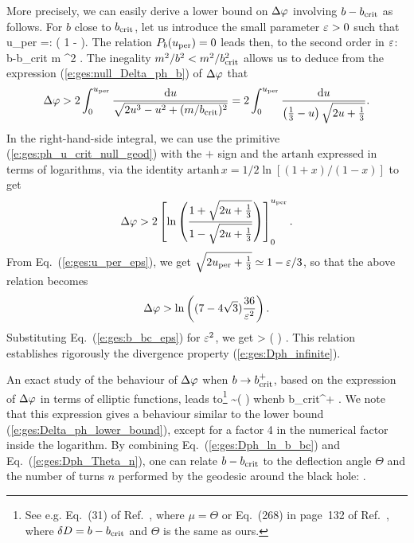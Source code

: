 More precisely, we can easily derive a lower bound on $\Delta\varphi$ involving
$b-b_{\rm crit}$ as follows. For $b$ close to $b_{\rm crit}$, let us introduce
the small parameter $\varepsilon >0$ such that
\be \label{e:ges:u_per_eps}
    u_{\rm per} =:  ( 1 - \veps ).
\ee
The relation $P_b(u_{\rm per}) = 0$ leads then, to the second order in $\varepsilon$:
\be \label{e:ges:b_bc_eps}
    b-b_{\rm crit} \simeq {} m \veps^2 .
\ee
The inegality $m^2/b^2 < m^2/b_{\rm crit}^2$ allows us to deduce from the expression
(\ref{e:ges:null_Delta_ph_b}) of $\Delta\varphi$ that
\[
    \Delta\varphi > 2 \int_0^{u_{\rm per}} \frac{\mathrm{d} u}{\sqrt{2 u^3 - u^2 + (m/b_{\rm crit})^2}}
      = 2 \int_0^{u_{\rm per}} \frac{\mathrm{d} u}{\left(\frac{1}{3} - u \right)
        \sqrt{2u + \frac{1}{3}}} .
\]
In the right-hand-side integral, we can use the primitive (\ref{e:ges:ph_u_crit_null_geod})
with the $+$ sign and the $\mathrm{artanh}$ expressed in terms of logarithms,
via the identity $\mathrm{artanh}\,  x = 1/2\ln[(1+x)/(1-x)]$ to get
\[
   \Delta\varphi > 2 \left[
   \ln \left( \frac{1 + \sqrt{2u + \frac{1}{3}}}{1 - \sqrt{2u + \frac{1}{3}}} \right)
   \right] _0^{u_{\rm per}} .
\]
From Eq.~(\ref{e:ges:u_per_eps}), we get $\sqrt{2u_{\rm per} + \frac{1}{3}} \simeq 1 - \varepsilon/3$,
so that the above relation becomes
\[
    \Delta\varphi > \ln\left( (7 - 4 \sqrt{3}) \frac{36}{\varepsilon^2} \right) .
\]
Substituting Eq.~(\ref{e:ges:b_bc_eps}) for $\varepsilon^2$, we get
\be \label{e:ges:Delta_ph_lower_bound}
    \Delta\ph > \ln\left(  \right) .
\ee
This relation establishes rigorously the divergence property
(\ref{e:ges:Dph_infinite}).

An exact study of the behaviour of $\Delta\varphi$ when $b \to b_{\rm crit}^+$,
based on the expression of $\Delta\varphi$ in terms of elliptic functions, leads
to\footnote{See e.g. Eq.~(31) of Ref.~\cite{Darwi59}, where $\mu = \Theta$
or Eq.~(268) in page~132 of Ref.~\cite{Chand83}, where $\delta D = b-b_{\rm crit}$ and
$\Theta$ is the same as ours.}
\be \label{e:ges:Dph_ln_b_bc}
    \Delta\ph \sim \ln\left(  \right)
    \qquad\mbox{when}\quad b \to b_{\rm crit}^+ .
\ee
We note that this expression gives a behaviour similar to the lower bound
(\ref{e:ges:Delta_ph_lower_bound}), except for a factor 4 in the numerical
factor inside the logarithm.
By combining Eq.~(\ref{e:ges:Dph_ln_b_bc}) and Eq.~(\ref{e:ges:Dph_Theta_n}),
one can relate $b - b_{\rm crit}$ to the deflection angle $\Theta$
and the number of turns $n$ performed by the geodesic around the black hole:
\be \label{e:ges:b_bc_exp_Theta}
   .
\ee

